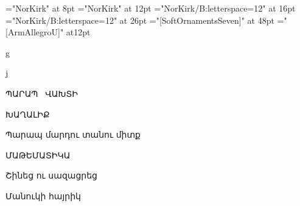 \font\hytextsm="NorKirk" at 8pt
\font\hytext="NorKirk" at 12pt
\font\hytitle="NorKirk/B:letterspace=12" at 16pt
\font\hytitlebig="NorKirk/B:letterspace=12" at 26pt
\font\ornaments="[SoftOrnamentsSeven]" at 48pt
\font\armallegro="[ArmAllegroU]" at12pt

\pdfpagewidth=105mm
\pdfpageheight=148.5mm

\hsize=90mm
\vsize=133mm

\hoffset=-17.9mm
\voffset=0mm

\nopagenumbers
\parindent=0pt

\null\vskip2.5cm\par
\centerline{{\ornaments g}}
\centerline{{\ornaments j}}

\vfill\eject

\hytext

\bigskip

\centerline{{\hytitle ՊԱՐԱՊ \ ՎԱԽՏԻ}}
\bigskip
\centerline{{\hytitlebig ԽԱՂԱԼԻՔ}}
\medskip
\centerline{{\hytext Պարապ մարդու տանու միտք}}
\vskip1cm

\centerline{ՄԱԹԵՄԱՏԻԿԱ}

\vskip2cm

\centerline{{\hytextsm Շինեց ու սազացրեց}}
\smallskip
\centerline{{\hytext Մանուկի հայրիկ}}

\vskip4cm
\centerline{{}}


\bye
